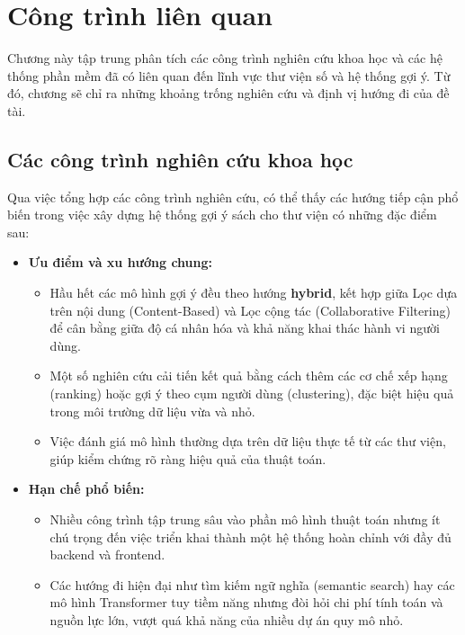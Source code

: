 \chapter{Công trình liên quan}

Chương này tập trung phân tích các công trình nghiên cứu khoa học và các hệ thống phần mềm đã có liên quan đến lĩnh vực thư viện số và hệ thống gợi ý. Từ đó, chương sẽ chỉ ra những khoảng trống nghiên cứu và định vị hướng đi của đề tài.

\section{Các công trình nghiên cứu khoa học}

Qua việc tổng hợp các công trình nghiên cứu, có thể thấy các hướng tiếp cận phổ biến trong việc xây dựng hệ thống gợi ý sách cho thư viện có những đặc điểm sau:

\begin{itemize}
    \item \textbf{Ưu điểm và xu hướng chung:}
    \begin{itemize}
        \item Hầu hết các mô hình gợi ý đều theo hướng \textbf{hybrid}, kết hợp giữa Lọc dựa trên nội dung (Content-Based) và Lọc cộng tác (Collaborative Filtering) để cân bằng giữa độ cá nhân hóa và khả năng khai thác hành vi người dùng.
        \item Một số nghiên cứu cải tiến kết quả bằng cách thêm các cơ chế xếp hạng (ranking) hoặc gợi ý theo cụm người dùng (clustering), đặc biệt hiệu quả trong môi trường dữ liệu vừa và nhỏ.
        \item Việc đánh giá mô hình thường dựa trên dữ liệu thực tế từ các thư viện, giúp kiểm chứng rõ ràng hiệu quả của thuật toán.
    \end{itemize}
    
    \item \textbf{Hạn chế phổ biến:}
    \begin{itemize}
        \item Nhiều công trình tập trung sâu vào phần mô hình thuật toán nhưng ít chú trọng đến việc triển khai thành một hệ thống hoàn chỉnh với đầy đủ backend và frontend.
        \item Các hướng đi hiện đại như tìm kiếm ngữ nghĩa (semantic search) hay các mô hình Transformer tuy tiềm năng nhưng đòi hỏi chi phí tính toán và nguồn lực lớn, vượt quá khả năng của nhiều dự án quy mô nhỏ.
    \end{itemize}
\end{itemize}

